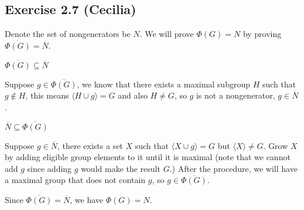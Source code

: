 \subsection*{Exercise 2.7 (Cecilia)}

Denote the set of nongenerators be $ N $. We will prove $ \Phi(G) = N $ by proving $ \overline{\Phi(G)} = \overline{N}$.

$ \overline{\Phi(G)} \subseteq \overline{N} $

Suppose $ g \in \overline{\Phi(G)} $, we know that there exists a maximal subgroup $ H $ such that $ g \notin H $, this means $ \langle H \cup g \rangle = G $ and also $ H \ne G $, so $ g $ is not a nongenerator, $ g \in \overline{N} $.

$ \overline{N} \subseteq \overline{\Phi(G)} $

Suppose $ g \in \overline{N} $, there exists a set $ X $ such that $ \langle X \cup g \rangle = G $ but $ \langle X \rangle \ne G $. Grow $ X $ by adding eligible group elements to it until it is maximal (note that we cannot add $ g $ since adding $ g $ would make the result $ G $.) After the procedure, we will have a maximal group that does not contain $ g $, so $ g \in \overline{\Phi(G)} $.

Since $ \overline{\Phi(G)} = \overline{N}$, we have $ \Phi(G) = N $.
